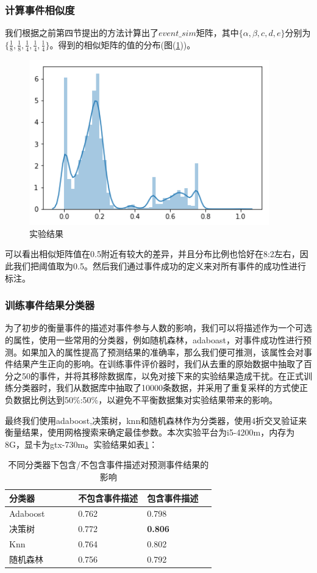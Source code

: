 \subsubsection{计算事件相似度}
我们根据之前第四节提出的方法计算出了\(event\_sim\)矩阵，其中\(\{\alpha,\beta,{c},{d},{e}\}\)分别为\(\{\frac{1}{8},\frac{1}{8},\frac{1}{4},\frac{1}{4},\frac{1}{4}\}\)。得到的相似矩阵的值的分布(图(\ref{f1-1}))。

\begin{figure}[htbp]
  \centering
  \includegraphics[width=10.4cm]{event_sim_dist.png}
  \caption{实验结果}
  \label{f1-1}
\end{figure}

可以看出相似矩阵值在0.5附近有较大的差异，并且分布比例也恰好在8:2左右，因此我们把阈值取为0.5。然后我们通过事件成功的定义来对所有事件的成功性进行标注。

\subsubsection{训练事件结果分类器}
为了初步的衡量事件的描述对事件参与人数的影响，我们可以将描述作为一个可选的属性，使用一些常用的分类器，例如随机森林，adaboast，对事件成功性进行预测。如果加入的属性提高了预测结果的准确率，那么我们便可推测，该属性会对事件结果产生正向的影响。在训练事件评价器时，我们从去重的原始数据中抽取了百分之50的事件，并将其移除数据库，以免对接下来的实验结果造成干扰。在正式训练分类器时，我们从数据库中抽取了10000条数据，并采用了重复采样的方式使正负数据比例达到50\%:50\%，以避免不平衡数据集对实验结果带来的影响。

最终我们使用adaboost,决策树，knn和随机森林作为分类器，使用4折交叉验证来衡量结果，使用网格搜索来确定最佳参数。本次实验平台为i5-4200m，内存为8G，显卡为gtx-730m。实验结果如表\ref{t1-3}：

\begin{table}[htbp] 
  \centering
  \caption{\label{t1-3}不同分类器下包含/不包含事件描述对预测事件结果的影响}
  \begin{tabular*}{\linewidth}{p{0.33\linewidth}p{0.33\linewidth}p{0.33\linewidth}}
\toprule 
分类器&不包含事件描述&包含事件描述\\
\midrule
Adaboost & 0.762 & 0.798 \\
决策树& 0.772 & \textbf{0.806} \\
Knn & 0.764 & 0.802  \\
随机森林 & 0.756 & 0.792 \\
\bottomrule
  \end{tabular*}
\end{table}


